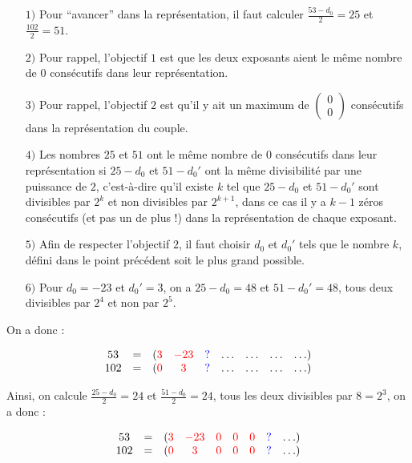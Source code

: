 \documentclass[12pt, a4paper]{memoir}
\newcommand{\doublezero}{\begin{pmatrix} 0 \\ 0 \end{pmatrix}}
\begin{document}
 \begin{itemize}
  \item [$1)$] Pour ``avancer'' dans la représentation, il faut calculer  $\frac{53 - d_0}{2} = 25$ et $\frac{102}{2} = 51$.
  \item [$2)$] Pour rappel, l'objectif $1$ est que les deux exposants aient le même nombre de $0$ consécutifs dans leur représentation.
  \item [$3)$] Pour rappel, l'objectif $2$ est qu'il y ait un maximum de $\doublezero$ consécutifs dans la représentation du couple.
  \item [$4)$] Les nombres $25$ et $51$ ont le même nombre de $0$ consécutifs dans leur représentation si $25 - d_0$ et $51 - d_0'$ 
  ont la même divisibilité par une puissance de $2$, c'est-à-dire qu'il existe $k$ tel que $25 - d_0$ et $51 - d_0'$ sont divisibles
  par $2^k$ et non divisibles par $2^{k+1}$, dans ce cas il y a $k-1$ zéros consécutifs (et pas un de plus !) dans la représentation
  de chaque exposant.
  \item [$5)$] Afin de respecter l'objectif $2$, il faut choisir $d_0$ et $d_0'$ tels que le nombre $k$, défini dans le point précédent
  soit le plus grand possible.
  \item [$6)$] Pour $d_0 = -23$ et $d_0' = 3$, on a $25 - d_0 = 48$ et $51 - d_0' = 48$, tous deux divisibles par $2^4$
  et non par $2^5$.
 \end{itemize}
  
  On a donc :
  
    $$\begin{array}{ccccccccc}
  53 & = & (\textcolor{red}{3} & \textcolor{red}{-23} & \textcolor{blue}{?} & \ldots & \ldots & \ldots & \ldots) \\
  102 & = & (\textcolor{red}{0} & \textcolor{red}{3} & \textcolor{blue}{?} & \ldots & \ldots & \ldots & \ldots)
 \end{array}$$

 Ainsi, on calcule $\frac{25 - d_0}{2} = 24$ et $\frac{51 - d_0}{2} = 24$, tous les deux divisibles par $8 = 2^3$, on a donc :
 
     $$\begin{array}{ccccccccc}
  53 & = & (\textcolor{red}{3} & \textcolor{red}{-23} & \textcolor{red}{0} & \textcolor{red}{0} & \textcolor{red}{0} & \textcolor{blue}{?} & \ldots) \\
  102 & = & (\textcolor{red}{0} & \textcolor{red}{3} & \textcolor{red}{0} & \textcolor{red}{0} & \textcolor{red}{0} & \textcolor{blue}{?} & \ldots)
 \end{array}$$
 
\end{document}
